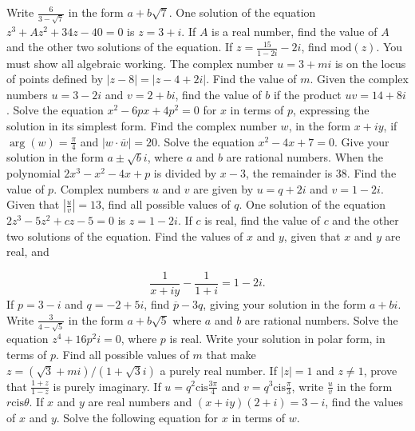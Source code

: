 \documentclass[12pt,addpoints]{exam}
\begin{document}
\begin{questions}
\fillwithlines{5cm}
\question[5] Write \( \frac{6}{3 - \sqrt{7}} \) in the form \( a + b\sqrt{7} \).
\fillwithlines{5cm}
\question[5] One solution of the equation \( z^3 + Az^2 + 34z - 40 = 0 \) is \( z = 3 + i \). If \( A \) is a real number, find the value of \( A \) and the other two solutions of the equation.
\fillwithlines{5cm}
\question[5] If \( z = \frac{15}{1 - 2i} - 2i \), find \(\text{mod}(z)\). You must show all algebraic working.
\fillwithlines{5cm}
\question[5] The complex number \( u = 3 + mi \) is on the locus of points defined by \( |z - 8| = |z - 4 + 2i| \). Find the value of \( m \).
\fillwithlines{5cm}
\question[5] Given the complex numbers \( u = 3 - 2i \) and \( v = 2 + bi \), find the value of \( b \) if the product \( uv = 14 + 8i \).
\fillwithlines{5cm}
\question[5] Solve the equation \( x^2 - 6px + 4p^2 = 0 \) for \( x \) in terms of \( p \), expressing the solution in its simplest form.
\fillwithlines{5cm}
\question[5] Find the complex number \( w \), in the form \( x + iy \), if \(\arg(w) = \frac{\pi}{4}\) and \(|w \cdot \overline{w}| = 20\).
\fillwithlines{5cm}
\question[5] Solve the equation \(x^2 - 4x + 7 = 0\). Give your solution in the form \(a \pm \sqrt{b}i\), where \(a\) and \(b\) are rational numbers.
\fillwithlines{5cm}
\question[5] When the polynomial \(2x^3 - x^2 - 4x + p\) is divided by \(x - 3\), the remainder is 38. Find the value of \(p\).
\fillwithlines{5cm}
\question[5] Complex numbers \(u\) and \(v\) are given by \(u = q + 2i\) and \(v = 1 - 2i\). Given that \(\left| \frac{u}{v} \right| = 13\), find all possible values of \(q\).
\fillwithlines{5cm}
\question[5] One solution of the equation \(2z^3 - 5z^2 + cz - 5 = 0\) is \(z = 1 - 2i\). If \(c\) is real, find the value of \(c\) and the other two solutions of the equation.
\fillwithlines{5cm}
\question[5] Find the values of \( x \) and \( y \), given that \( x \) and \( y \) are real, and

\[
\frac{1}{x + iy} - \frac{1}{1 + i} = 1 - 2i.
\]
\fillwithlines{5cm}
\question[5] If \( p = 3 - i \) and \( q = -2 + 5i \), find \( \overline{p} - 3q \), giving your solution in the form \( a + bi \).
\fillwithlines{5cm}
\question[5] Write \( \frac{3}{4 - \sqrt{5}} \) in the form \( a + b\sqrt{5} \) where \( a \) and \( b \) are rational numbers.
\fillwithlines{5cm}
\question[5] Solve the equation \( z^4 + 16p^2i = 0 \), where \( p \) is real. Write your solution in polar form, in terms of \( p \).
\fillwithlines{5cm}
\question[5] Find all possible values of \( m \) that make \( z = (\sqrt{3} + mi) / (1 + \sqrt{3}i) \) a purely real number.
\fillwithlines{5cm}
\question[5] If \( |z| = 1 \) and \( z \neq 1 \), prove that \(\frac{1+z}{1-z}\) is purely imaginary.
\fillwithlines{5cm}
\question[5] If \( u = q^2 \text{cis} \frac{3\pi}{4} \) and \( v = q^3 \text{cis} \frac{\pi}{3} \), write \( \frac{u}{v} \) in the form \( r \text{cis} \theta \).
\fillwithlines{5cm}
\question[5] If \( x \) and \( y \) are real numbers and \( (x + iy)(2 + i) = 3 - i \), find the values of \( x \) and \( y \).
\fillwithlines{5cm}
\question[5] Solve the following equation for \( x \) in terms of \( w \).


\end{questions}
\end{document}
